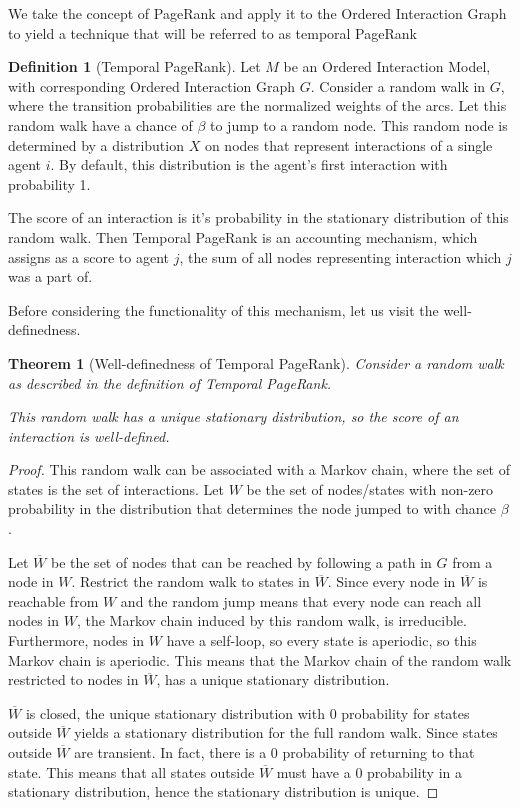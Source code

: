\documentclass[a4paper,11pt]{book}
\newcommand{\ov}{\overline}
\newtheorem{theorem}{Theorem}
\theoremstyle{definition}
\newtheorem{definition}{Definition}
\begin{document}
We take the concept of PageRank and apply it to the Ordered Interaction Graph to
yield a technique that will be referred to as temporal PageRank

\begin{definition}[Temporal PageRank]
    Let $M$ be an Ordered Interaction Model, with corresponding Ordered Interaction Graph $G$.
    Consider a random walk in $G$, where the transition probabilities are the normalized
    weights of the arcs. Let this random walk have a chance of $\beta$ to jump to a random node.
    This random node is determined by a distribution $X$ on nodes that represent interactions of
    a single agent $i$. By default, this distribution is the agent's first interaction with probability 1.

    The score of an interaction is it's probability in the stationary distribution of this random walk.
    Then Temporal PageRank is an accounting mechanism, which assigns as a score to agent $j$, the
    sum of all nodes representing interaction which $j$ was a part of.
\end{definition}


Before considering the functionality of this mechanism, let us visit the well-definedness.

\begin{theorem}[Well-definedness of Temporal PageRank]
    Consider a random walk as described in the definition of Temporal PageRank.

    This random walk has a unique stationary distribution, so the score of an interaction is well-defined.
    \label{thm:well_defined}
\end{theorem}
\begin{proof}
    This random walk can be associated with a Markov chain, where the set of states is the set of
    interactions. Let $W$ be the set of nodes/states with non-zero probability in the distribution
    that determines the node jumped to with chance $\beta$.

    Let $\ov{W}$ be the set of nodes that can be reached by following a path in $G$ from a node
    in $W$. Restrict the random walk to states in $\ov{W}$. Since every node in $\ov{W}$ is reachable
    from $W$ and the random jump means that every node can reach all nodes in $W$, the Markov chain
    induced by this random walk, is irreducible. Furthermore, nodes in $W$ have a self-loop, so every
    state is aperiodic, so this Markov chain is aperiodic. This means that the Markov chain of the
    random walk restricted to nodes in $\ov{W}$, has a unique stationary distribution.

    $\ov{W}$ is closed, the unique stationary distribution with $0$ probability for states outside
    $\ov{W}$ yields a stationary distribution for the full random walk. Since states
    outside $\ov{W}$ are transient. In fact, there is a $0$ probability of returning to that
    state. This means that all states outside $\ov{W}$ must have a $0$ probability in a stationary
    distribution, hence the stationary distribution is unique.
\end{proof}
\end{document}

